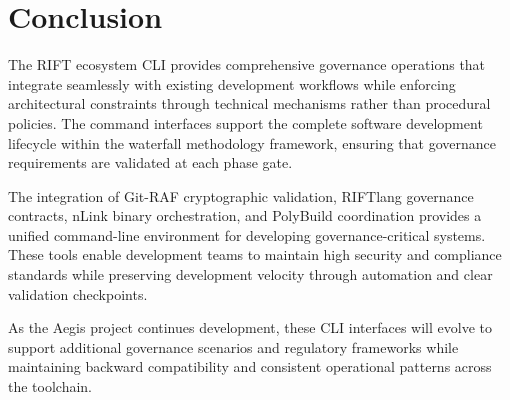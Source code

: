\documentclass[11pt,letterpaper]{article}
\begin{document}
\section{Conclusion}

The RIFT ecosystem CLI provides comprehensive governance operations that integrate seamlessly with existing development workflows while enforcing architectural constraints through technical mechanisms rather than procedural policies. The command interfaces support the complete software development lifecycle within the waterfall methodology framework, ensuring that governance requirements are validated at each phase gate.

The integration of Git-RAF cryptographic validation, RIFTlang governance contracts, nLink binary orchestration, and PolyBuild coordination provides a unified command-line environment for developing governance-critical systems. These tools enable development teams to maintain high security and compliance standards while preserving development velocity through automation and clear validation checkpoints.

As the Aegis project continues development, these CLI interfaces will evolve to support additional governance scenarios and regulatory frameworks while maintaining backward compatibility and consistent operational patterns across the toolchain.
\end{document}
